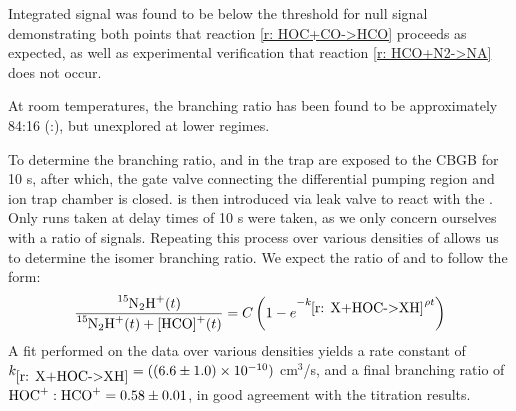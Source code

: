 Integrated  signal was found to be below the threshold for null signal demonstrating both points that reaction \ref{r: HOC+CO->HCO} proceeds as expected, as well as experimental verification that reaction \ref{r: HCO+N2->NA} does not occur.

At room temperatures, the branching ratio has been found to be approximately 84:16 (:)\cite{Freeman1987}, but unexplored at lower regimes.

To determine the branching ratio,  and  in the trap are exposed to the CBGB for 10 s, after which, the gate valve connecting the differential pumping region and ion trap chamber is closed.  is then introduced via leak valve to react with the . Only runs taken at delay times of 10 s were taken, as we only concern ourselves with a ratio of signals. Repeating this process over various densities of  allows us to determine the isomer branching ratio. We expect the ratio of  and \ce{[HCO]+} to follow the form:
\begin{equation}
	\frac{\ce{^{15}N2H+}(t)}{\ce{^{15}N2H+}(t)+\ce{[HCO]+}(t)} = C \left( 1-e^{-k_{\ref{r: X+HOC->XH}} \rho t} \right)
	\label{eq: N2 asymptote}
\end{equation}
A fit performed on the data over various densities yields a rate constant of $k_{\ref{r: X+HOC->XH}} = ((6.6 \pm 1.0) \times 10^{-10})$ cm$^3$/s, and a final branching ratio of $\ce{HOC+}:\ce{HCO+} = 0.58 \pm 0.01$, in good agreement with the  titration results.

